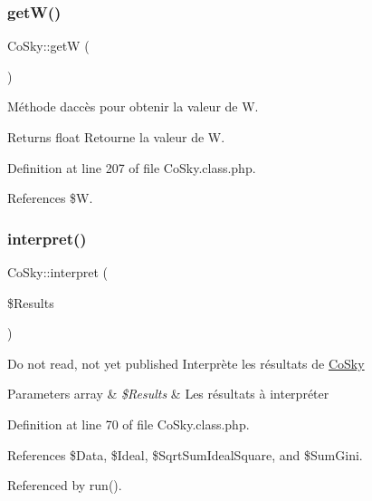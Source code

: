\mbox{\label{class_co_sky_af8150544b7cbed08fb4564651ff8eb97}} 
\subsubsection{\texorpdfstring{get\+W()}{getW()}}
{\footnotesize\ttfamily Co\+Sky\+::getW (\begin{DoxyParamCaption}{ }\end{DoxyParamCaption})}

Méthode d\textquotesingle{}accès pour obtenir la valeur de W.

\begin{DoxyReturn}{Returns}
float Retourne la valeur de W. 
\end{DoxyReturn}


Definition at line 207 of file Co\+Sky.\+class.\+php.



References \$W.

\mbox{\label{class_co_sky_a21516052fcf7945de5775fda402af8e3}} 
\subsubsection{\texorpdfstring{interpret()}{interpret()}}
{\footnotesize\ttfamily Co\+Sky\+::interpret (\begin{DoxyParamCaption}\item[{}]{\$\+Results }\end{DoxyParamCaption})\hspace{0.3cm}{\ttfamily [protected]}}

Do not read, not yet published Interprète les résultats de \hyperlink{class_co_sky}{Co\+Sky} 
\begin{DoxyParams}[1]{Parameters}
array & {\em \$\+Results} & Les résultats à interpréter \\
\hline
\end{DoxyParams}


Definition at line 70 of file Co\+Sky.\+class.\+php.



References \$\+Data, \$\+Ideal, \$\+Sqrt\+Sum\+Ideal\+Square, and \$\+Sum\+Gini.



Referenced by run().

